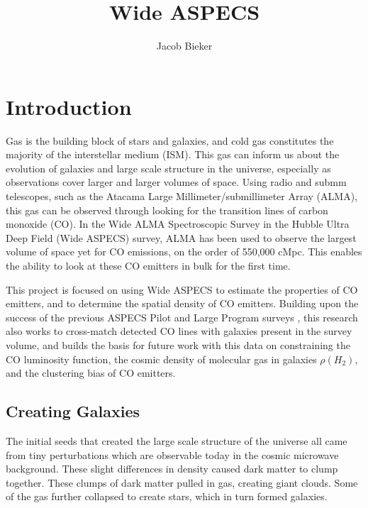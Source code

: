 \documentclass[twoside,single]{lion-msc}
\title{Wide ASPECS}
\author{Jacob Bieker}
\affiliation{Leiden Observatory, Leiden University}
\begin{document}
\maketitle

\setcounter{page}{2}
\tableofcontents
\cleardoublepage

\setcounter{page}{1}
\chapter{Introduction}

Gas is the building block of stars and galaxies, and cold gas constitutes the majority of the interstellar medium (ISM). This gas can inform us about the evolution of galaxies and large scale structure in the universe, especially as observations cover larger and larger volumes of space. Using radio and submm telescopes, such as the Atacama Large Millimeter/submillimeter Array (ALMA), this gas can be observed through looking for the transition lines of carbon monoxide (CO). In the Wide ALMA Spectroscopic Survey in the Hubble Ultra Deep Field (Wide ASPECS) survey, ALMA has been used to observe the largest volume of space yet for CO emissions, on the order of 550,000 cMpc. This enables the ability to look at these CO emitters in bulk for the first time.

This project is focused on using Wide ASPECS to estimate the properties of CO emitters, and to determine the spatial density of CO emitters. Building upon the success of the previous ASPECS Pilot and Large Program surveys \cite{walter2016alma, decarli2019alma}, this research also works to cross-match detected CO lines with galaxies present in the survey volume, and builds the basis for future work with this data on constraining the CO luminosity function, the cosmic density of molecular gas in galaxies $\rho(H_2)$, and the clustering bias of CO emitters.

\section{Creating Galaxies}

The initial seeds that created the large scale structure of the universe all came from tiny perturbations which are observable today in the cosmic microwave background. These slight differences in density caused dark matter to clump together. These clumps of dark matter pulled in gas, creating giant clouds. Some of the gas further collapsed to create stars, which in turn formed galaxies.
\end{document}
